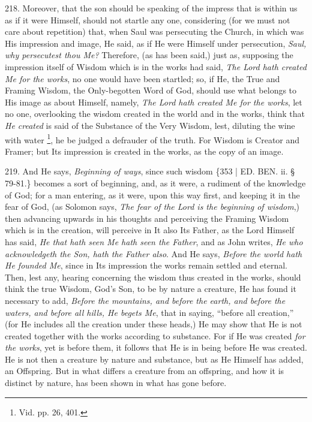 218. Moreover, that the son
should be speaking of the impress that is within us as if it were
Himself, should not startle any one, considering (for we must not care
about repetition) that, when Saul was persecuting the Church, in which
was His impression and image, He said, as if He were Himself under
persecution, \emph{Saul, why persecutest thou Me?} Therefore, (as has
been said,) just as, supposing the impression itself of Wisdom which
is in the works had said, \emph{The Lord hath created Me for the works},
no one would have been startled; so, if He, the True and Framing
Wisdom, the Only-begotten Word of God, should use what belongs to His
image as about Himself, namely, \emph{The Lord hath created Me for the
works}, let no one, overlooking the wisdom created in the world and
in the works, think that \emph{He created} is said of the Substance of
the Very Wisdom, lest, diluting the wine with water \footnote{Vid. pp. 26, 401.}, he be judged a defrauder of the truth. For Wisdom is Creator
and Framer; but Its impression is created in the works, as the copy of
an image.

219. And He says, \emph{Beginning
of ways}, since such wisdom \{353 | ED. BEN.
ii. § 79-81.\} becomes a sort of beginning, and, as it were, a
rudiment of the knowledge of God; for a man entering, as it were, upon
this way first, and keeping it in the fear of God, (as Solomon says, \emph{The
fear of the Lord is the beginning of wisdom},) then advancing
upwards in his thoughts and perceiving the Framing Wisdom which is in
the creation, will perceive in It also Its Father, as the Lord Himself
has said, \emph{He that hath seen Me hath seen the Father}, and as
John writes, \emph{He who acknowledgeth the Son, hath the Father also}.
And He says, \emph{Before the world hath He founded Me}, since in Its
impression the works remain settled and eternal. Then, lest any,
hearing concerning the wisdom thus created in the works, should think
the true Wisdom, God's Son, to be by nature a creature, He has found
it necessary to add, \emph{Before the mountains, and before the earth,
and before the waters, and before all hills, He begets Me}, that in
saying, ``before all creation,'' (for He includes all the creation under
these heads,) He may show that He is not created together with the
works according to substance. For if He was created \emph{for the works},
yet is before them, it follows that He is in being before He was
created. He is not then a creature by nature and substance, but as He
Himself has added, an Offspring. But in what differs a creature from
an offspring, and how it is distinct by nature, has been shown in what
has gone before.

